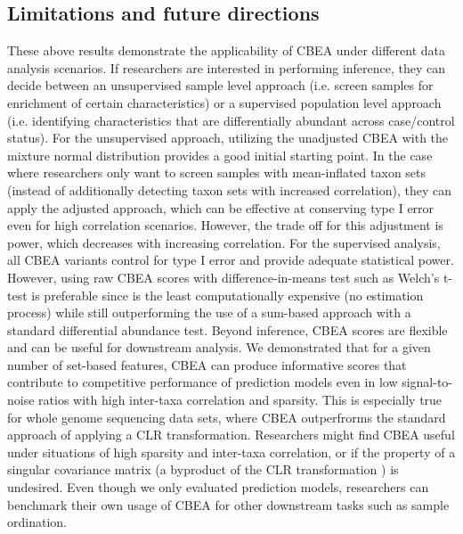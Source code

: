 \subsection{Limitations and future directions} 
These above results demonstrate the applicability of CBEA under different data analysis scenarios. If researchers are interested in performing inference, they can decide between an unsupervised sample level approach (i.e. screen samples for enrichment of certain characteristics) or a supervised population level approach (i.e. identifying characteristics that are differentially abundant across case/control status). For the unsupervised approach, utilizing the unadjusted CBEA with the mixture normal distribution provides a good initial starting point. In the case where researchers only want to screen samples with mean-inflated taxon sets (instead of additionally detecting taxon sets with increased correlation), they can apply the adjusted approach, which can be effective at conserving type I error even for high correlation scenarios. However, the trade off for this adjustment is power, which decreases with increasing correlation. For the supervised analysis, all CBEA variants control for type I error and provide adequate statistical power. However, using raw CBEA scores with difference-in-means test such as Welch's t-test is preferable since is the least computationally expensive (no estimation process) while still outperforming the use of a sum-based approach with a standard differential abundance test.     
Beyond inference, CBEA scores are flexible and can be useful for downstream analysis. We demonstrated that for a given number of set-based features, CBEA can produce informative scores that contribute to competitive performance of prediction models even in low signal-to-noise ratios with high inter-taxa correlation and sparsity. This is especially true for whole genome sequencing data sets, where CBEA outperfrorms the standard approach of applying a CLR transformation. Researchers might find CBEA useful under situations of high sparsity and inter-taxa correlation, or if the property of a singular covariance matrix (a byproduct of the CLR transformation \cite{gloor2017}) is undesired. Even though we only evaluated prediction models, researchers can benchmark their own usage of CBEA for other downstream tasks such as sample ordination. 
